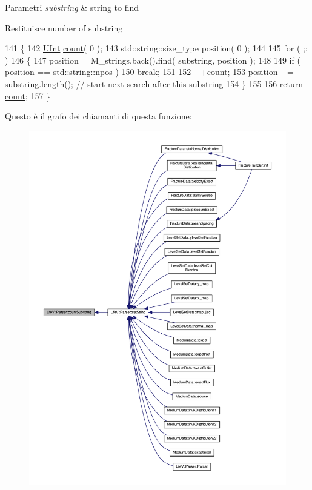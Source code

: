 \begin{DoxyParams}{Parametri}
{\em substring} & string to find \\
\hline
\end{DoxyParams}
\begin{DoxyReturn}{Restituisce}
number of substring 
\end{DoxyReturn}

\begin{DoxyCode}
141 \{
142     \hyperlink{namespaceLifeV_a4bd093cf6b0d5b57b2d89e0e90d610b7}{UInt} \hyperlink{matrici_8m_ae11b3deb3de3df7dc48e439074023e35}{count}( 0 );
143     std::string::size\_type position( 0 );
144 
145     \textcolor{keywordflow}{for} ( ;; )
146     \{
147         position = M\_strings.back().find( substring, position );
148 
149         \textcolor{keywordflow}{if} ( position == std::string::npos )
150             \textcolor{keywordflow}{break};
151 
152         ++\hyperlink{matrici_8m_ae11b3deb3de3df7dc48e439074023e35}{count};
153         position += substring.length(); \textcolor{comment}{// start next search after this substring}
154     \}
155 
156     \textcolor{keywordflow}{return} \hyperlink{matrici_8m_ae11b3deb3de3df7dc48e439074023e35}{count};
157 \}
\end{DoxyCode}


Questo è il grafo dei chiamanti di questa funzione\-:\nopagebreak
\begin{figure}[H]
\begin{center}
\leavevmode
\includegraphics[width=350pt]{classLifeV_1_1Parser_a37ae3af9abcf72ca8e1537ec771b523a_icgraph}
\end{center}
\end{figure}


